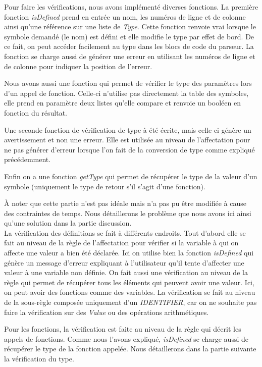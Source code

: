 \documentclass[a4paper]{article}%
\begin{document}
Pour faire les vérifications, nous avons implémenté diverses fonctions. La
première fonction \textit{isDefined} prend en entrée un nom, les numéros de
ligne et de colonne ainsi qu'une référence sur une liste de \textit{Type}.
Cette fonction renvoie vrai lorsque le symbole demandé (le nom) est défini et
elle modifie le type par effet de bord. De ce fait, on peut accéder facilement
au type dans les blocs de code du parseur. La fonction se charge aussi
de générer une erreur en utilisant les numéros de ligne et de colonne pour
indiquer la position de l'erreur.

Nous avons aussi une fonction qui permet de vérifier le type des paramètres lors
d'un appel de fonction. Celle-ci n'utilise pas directement la table des
symboles, elle prend en paramètre deux listes qu'elle compare et renvoie un
booléen en fonction du résultat.

Une seconde fonction de vérification de type à été écrite, mais celle-ci génère
un avertissement et non une erreur. Elle est utilisée au niveau de l'affectation
pour ne pas générer d'erreur lorsque l'on fait de la conversion de type comme
expliqué précédemment.

Enfin on a une fonction \textit{getType} qui permet de récupérer le type de la
valeur d'un symbole (uniquement le type de retour s'il s'agit d'une fonction).

À noter que cette partie n'est pas idéale mais n'a pas pu être modifiée à cause
des contraintes de temps. Nous détaillerons le problème que nous avons ici ainsi
qu'une solution dans la partie discussion.\\

La vérification des définitions se fait à différents endroits. Tout d'abord elle
se fait au niveau de la règle de l'affectation pour vérifier si la variable à
qui on affecte une valeur a bien été déclarée. Ici on utilise bien la fonction
\textit{isDefined} qui génère un message d'erreur expliquant à l'utilisateur
qu'il tente d'affecter une valeur à une variable non définie. On fait aussi une
vérification au niveau de la règle qui permet de récupérer tous les éléments qui
peuvent avoir une valeur. Ici, on peut avoir des fonctions comme des variables.
La vérification se fait au niveau de la sous-règle composée uniquement d'un
\textit{IDENTIFIER}, car on ne souhaite pas faire la vérification sur des
\textit{Value} ou des opérations arithmétiques.

Pour les fonctions, la vérification est faite au niveau de la règle qui décrit
les appels de fonctions. Comme nous l'avons expliqué, \textit{isDefined} se
charge aussi de récupérer le type de la fonction appelée. Nous détaillerons dans
la partie suivante la vérification du type.
\end{document}
